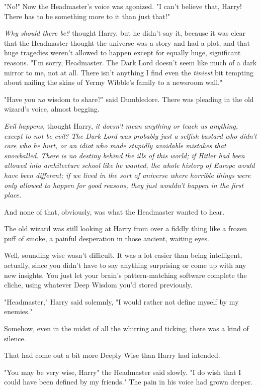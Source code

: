 "No!" Now the Headmaster's voice was agonized. "I can't believe that, Harry!
There has to be something more to it than just that!"

\emph{Why should there be?} thought Harry, but he didn't say it, because it was
clear that the Headmaster thought the universe was a story and had a plot, and
that huge tragedies weren't allowed to happen except for equally huge,
significant reasons. "I'm sorry, Headmaster. The Dark Lord doesn't seem like
much of a dark mirror to me, not at all. There isn't anything I find even the
\emph{tiniest} bit tempting about nailing the skins of Yermy Wibble's family to
a newsroom wall."

"Have you \emph{no} wisdom to share?" said Dumbledore. There was pleading in
the old wizard's voice, almost begging.

\emph{Evil happens,} thought Harry, \emph{it doesn't mean anything or teach us
anything, except to not be evil? The Dark Lord was probably just a selfish
bastard who didn't care who he hurt, or an idiot who made stupidly avoidable
mistakes that snowballed. There is no destiny behind the ills of this world; if
Hitler had been allowed into architecture school like he wanted, the whole
history of Europe would have been different; if we lived in the sort of
universe where horrible things were only allowed to happen for good reasons,
they just wouldn't happen in the first place.}

And none of that, obviously, was what the Headmaster wanted to hear.

The old wizard was still looking at Harry from over a fiddly thing like a
frozen puff of smoke, a painful desperation in those ancient, waiting eyes.

Well, sounding wise wasn't difficult. It was a lot easier than being
intelligent, actually, since you didn't have to say anything surprising or come
up with any new insights. You just let your brain's pattern-matching software
complete the cliche, using whatever Deep Wisdom you'd stored previously.

"Headmaster," Harry said solemnly, "I would rather not define myself by my
enemies."

Somehow, even in the midst of all the whirring and ticking, there was a kind of
silence.

That had come out a bit more Deeply Wise than Harry had intended.

"You may be very wise, Harry{\el}" the Headmaster said slowly. "I do
wish{\el} that I could have been defined by my friends." The pain in his
voice had grown deeper.

